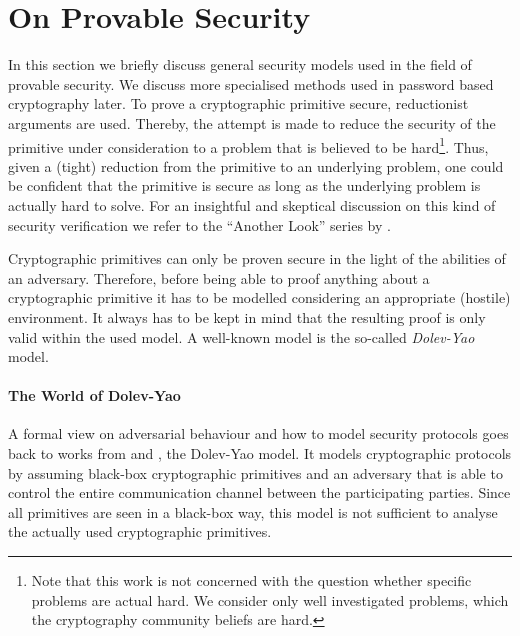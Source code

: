 
\section{On Provable Security}
In this section we briefly discuss general security models used in the field of provable security.
We discuss more specialised methods used in password based cryptography later.
To prove a cryptographic primitive secure, reductionist arguments are used.
Thereby, the attempt is made to reduce the security of the primitive under consideration to a problem that is believed to be hard\footnote{Note that this work is not concerned with the question whether specific problems are actual hard. We consider only well investigated problems, which the cryptography community beliefs are hard.}.
Thus, given a (tight) reduction from the primitive to an underlying problem, one could be confident that the primitive is secure as long as the underlying problem is actually hard to solve.
For an insightful and skeptical discussion on this kind of security verification we refer to the ``Another Look'' series by \citeauthor{AnotherLook} \cite{AnotherLook}.

Cryptographic primitives can only be proven secure in the light of the abilities of an adversary.
Therefore, before being able to proof anything about a cryptographic primitive it has to be modelled considering an appropriate (hostile) environment.
It always has to be kept in mind that the resulting proof is only valid within the used model.
A well-known model is the so-called \emph{Dolev-Yao} model.

\paragraph{The World of Dolev-Yao}
A formal view on adversarial behaviour and how to model security protocols goes back to works from \citeauthor{Needham78} \citeyear{Needham78} \cite{Needham78} and \citeauthor{Dolev83} \citeyear{Dolev83} \cite{Dolev83}, the Dolev-Yao model. It models cryptographic protocols by assuming black-box cryptographic primitives and an adversary that is able to control the entire communication channel between the participating parties.
Since all primitives are seen in a black-box way, this model is not sufficient to analyse the actually used cryptographic primitives.

